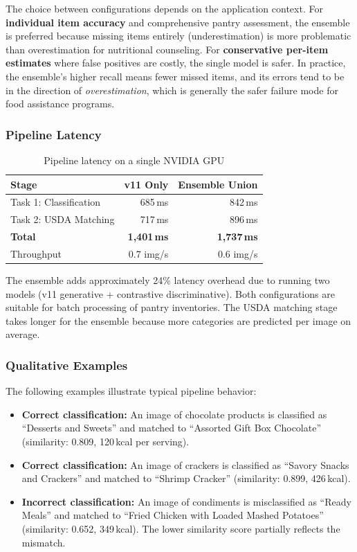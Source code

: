 The choice between configurations depends on the application context. For \textbf{individual item accuracy} and comprehensive pantry assessment, the ensemble is preferred because missing items entirely (underestimation) is more problematic than overestimation for nutritional counseling. For \textbf{conservative per-item estimates} where false positives are costly, the single model is safer. In practice, the ensemble's higher recall means fewer missed items, and its errors tend to be in the direction of \textit{overestimation}, which is generally the safer failure mode for food assistance programs.

\subsubsection{Pipeline Latency}

\begin{table}[h]
\centering
\caption{Pipeline latency on a single NVIDIA GPU}
\label{tab:latency}
\begin{tabular}{lrr}
\toprule
Stage & v11 Only & Ensemble Union \\
\midrule
Task 1: Classification & 685\,ms & 842\,ms \\
Task 2: USDA Matching & 717\,ms & 896\,ms \\
\midrule
\textbf{Total} & \textbf{1,401\,ms} & \textbf{1,737\,ms} \\
Throughput & 0.7 img/s & 0.6 img/s \\
\bottomrule
\end{tabular}
\end{table}

The ensemble adds approximately 24\% latency overhead due to running two models (v11 generative + contrastive discriminative). Both configurations are suitable for batch processing of pantry inventories. The USDA matching stage takes longer for the ensemble because more categories are predicted per image on average.

\subsubsection{Qualitative Examples}

The following examples illustrate typical pipeline behavior:

\begin{itemize}[nosep,leftmargin=1.5em]
  \item \textbf{Correct classification:} An image of chocolate products is classified as ``Desserts and Sweets'' and matched to ``Assorted Gift Box Chocolate'' (similarity: 0.809, 120\,kcal per serving).
  \item \textbf{Correct classification:} An image of crackers is classified as ``Savory Snacks and Crackers'' and matched to ``Shrimp Cracker'' (similarity: 0.899, 426\,kcal).
  \item \textbf{Incorrect classification:} An image of condiments is misclassified as ``Ready Meals'' and matched to ``Fried Chicken with Loaded Mashed Potatoes'' (similarity: 0.652, 349\,kcal). The lower similarity score partially reflects the mismatch.
\end{itemize}


